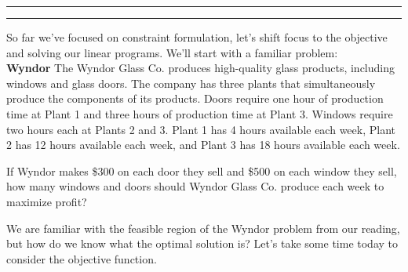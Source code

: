\documentclass[12pt]{article}
\begin{document}

\vspace{.5em}
\hrule \hrule
\vspace{.5em}

\noindent So far we've focused on constraint formulation, let's shift focus to the objective and solving our linear programs. We'll start with a familiar problem:\\

\noindent \textbf{Wyndor}  The Wyndor Glass Co. produces high-quality glass products, including windows and glass doors. The company has three plants that simultaneously produce the components of its products. Doors require one hour of production time at Plant 1 and three hours of production time at Plant 3. Windows require two hours each at Plants 2 and 3. Plant 1 has 4 hours available each week, Plant 2 has 12 hours available each week, and Plant 3 has 18 hours available each week.\par \vspace{9pt} 
    
\noindent If Wyndor makes \$300 on each door they sell and \$500 on each window they sell, how many windows and doors should Wyndor Glass Co. produce each week to maximize profit?\par \vspace{9pt} 

\noindent We are familiar with the feasible region of the Wyndor problem from our reading, but how do we know what the optimal solution is? Let's take some time today to consider the objective function.
\end{document}
